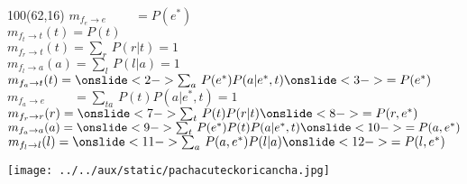 \documentclass[shownotes,aspectratio=169]{beamer}
\begin{document}
\begin{frame}[plain]
\begin{textblock}{100}(62,16)
 $m_{f_e\rightarrow e}\phantom{(e)} = P(e^*) $  \\
 $m_{f_t\rightarrow t}(t) = P(t)$  \\
 $m_{f_r\rightarrow t}(t) = \sum_r \, P(r|t) = 1$  \\
 $m_{f_l\rightarrow a}(a) = \sum_l \, P(l|a) = 1 $  \\
 $m_{f_a\rightarrow t}(t) = \onslide<2->{\sum_{a} \, P(e^*) P(a|e^*,t)} \onslide<3->{= P(e^*)}$  \\
 $m_{f_a\rightarrow e}\phantom{(e)} = \sum_{ta} \, P(t) P(a|e^*,t) = 1$  \\
 $m_{f_r\rightarrow r}(r) = \onslide<7->{\sum_{t} \, P(t) P(r|t)} \onslide<8->{= P(r,e^*)}$ \\
 $m_{f_a\rightarrow a}(a) = \onslide<9->{\sum_{t} \, P(e^*)P(t)P(a|e^*,t)}\onslide<10->{  = P(a,e^*)}$  \\
 $m_{f_l\rightarrow l}(l) = \onslide<11->{\sum_{a} \, P(a,e^*) P(l|a)} \onslide<12->{ = P(l,e^*)}$
 \end{textblock}

 





 
\end{frame}



\begin{frame}[plain]
\centering
  \texttt{[image: ../../aux/static/pachacuteckoricancha.jpg]}
\end{frame}
\end{document}
